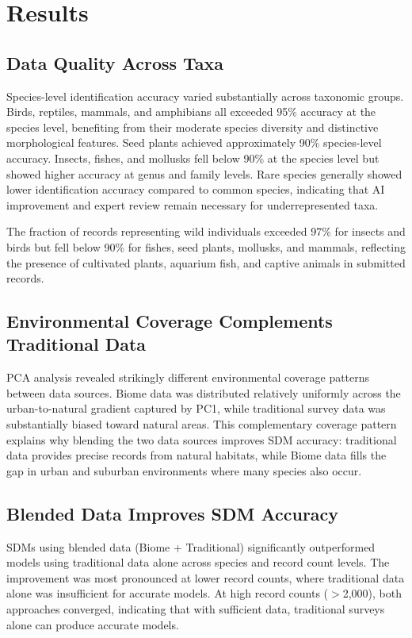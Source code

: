 \documentclass[11pt]{article}
\begin{document}
\section{Results}

\subsection{Data Quality Across Taxa}

Species-level identification accuracy varied substantially across taxonomic groups. Birds, reptiles, mammals, and amphibians all exceeded 95\% accuracy at the species level, benefiting from their moderate species diversity and distinctive morphological features. Seed plants achieved approximately 90\% species-level accuracy. Insects, fishes, and mollusks fell below 90\% at the species level but showed higher accuracy at genus and family levels. Rare species generally showed lower identification accuracy compared to common species, indicating that AI improvement and expert review remain necessary for underrepresented taxa.

The fraction of records representing wild individuals exceeded 97\% for insects and birds but fell below 90\% for fishes, seed plants, mollusks, and mammals, reflecting the presence of cultivated plants, aquarium fish, and captive animals in submitted records.

\subsection{Environmental Coverage Complements Traditional Data}

PCA analysis revealed strikingly different environmental coverage patterns between data sources. Biome data was distributed relatively uniformly across the urban-to-natural gradient captured by PC1, while traditional survey data was substantially biased toward natural areas. This complementary coverage pattern explains why blending the two data sources improves SDM accuracy: traditional data provides precise records from natural habitats, while Biome data fills the gap in urban and suburban environments where many species also occur.

\subsection{Blended Data Improves SDM Accuracy}

SDMs using blended data (Biome + Traditional) significantly outperformed models using traditional data alone across species and record count levels. The improvement was most pronounced at lower record counts, where traditional data alone was insufficient for accurate models. At high record counts ($>$2,000), both approaches converged, indicating that with sufficient data, traditional surveys alone can produce accurate models.
\end{document}
